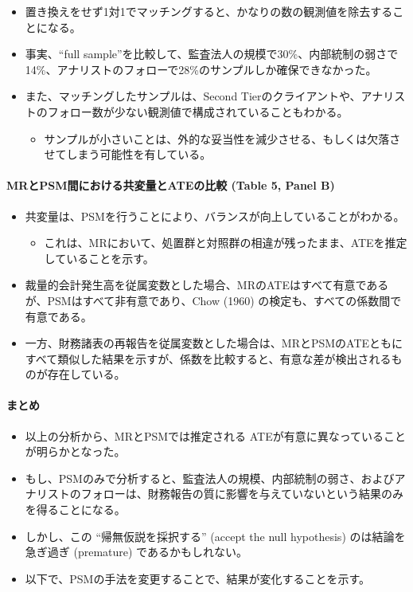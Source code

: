 \begin{itemize}
 \item 置き換えをせず1対1でマッチングすると、かなりの数の観測値を除去することになる。
 \item 事実、“full sample”を比較して、監査法人の規模で30\%、内部統制の弱さで14\%、アナリストのフォローで28\%のサンプルしか確保できなかった。
 \item また、マッチングしたサンプルは、Second Tierのクライアントや、アナリストのフォロー数が少ない観測値で構成されていることもわかる。
  \begin{itemize}
   \item サンプルが小さいことは、外的な妥当性を減少させる、もしくは欠落させてしまう可能性を有している。
  \end{itemize}
\end{itemize}

\paragraph{MRとPSM間における共変量とATEの比較 (Table 5, Panel B) }

\begin{itemize}
 \item 共変量は、PSMを行うことにより、バランスが向上していることがわかる。
  \begin{itemize}
   \item これは、MRにおいて、処置群と対照群の相違が残ったまま、ATEを推定していることを示す。
  \end{itemize}
 \item 裁量的会計発生高を従属変数とした場合、MRのATEはすべて有意であるが、PSMはすべて非有意であり、Chow (1960) の検定も、すべての係数間で有意である。
 \item 一方、財務諸表の再報告を従属変数とした場合は、MRとPSMのATEともにすべて類似した結果を示すが、係数を比較すると、有意な差が検出されるものが存在している。
\end{itemize}

\paragraph{まとめ}
\begin{itemize}
 \item 以上の分析から、MRとPSMでは推定される ATEが有意に異なっていることが明らかとなった。
 \item もし、PSMのみで分析すると、監査法人の規模、内部統制の弱さ、およびアナリストのフォローは、財務報告の質に影響を与えていないという結果のみを得ることになる。
 \item しかし、この ``帰無仮説を採択する''  (accept the null hypothesis) のは結論を急ぎ過ぎ  (premature) であるかもしれない。
 \item 以下で、PSMの手法を変更することで、結果が変化することを示す。
\end{itemize}

